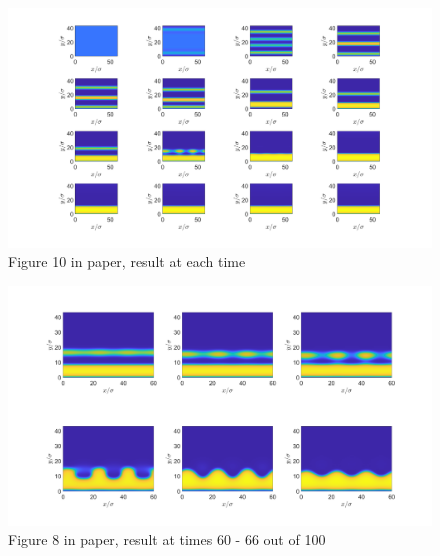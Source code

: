 \documentclass[11pt, a4paper]{article}
\theoremstyle{definition}
\begin{document}
	\begin{figure}[h]
		\centering
		\includegraphics[scale=0.25]{Plotrhobar02.png}
		\caption{Figure 10 in paper, result at each time} 
		\label{F5}
	\end{figure}
	\begin{figure}[h]
		\centering
		\includegraphics[scale=0.25]{rhobar02Zoom60to66.png}
		\caption{Figure 8 in paper, result at times 60 - 66 out of 100} 
		\label{F6}
	\end{figure}
	
\end{document}
